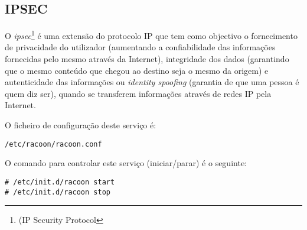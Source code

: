 \subsection{IPSEC}

O \emph{ipsec}\footnote{(IP Security Protocol} é uma extensão do protocolo IP que tem como objectivo o fornecimento de privacidade do utilizador (aumentando a confiabilidade das informações fornecidas pelo mesmo através da Internet), integridade dos dados (garantindo que o mesmo conteúdo que chegou ao destino seja o mesmo da origem) e autenticidade das informações ou \emph{identity spoofing} (garantia de que uma pessoa é quem diz ser), quando se transferem informações através de redes IP pela Internet.

O ficheiro de configuração deste serviço é:

\begin{Verbatim}[commandchars=\\\{\}]
/etc/racoon/racoon.conf
\end{Verbatim}

O comando para controlar este serviço (iniciar/parar) é o seguinte:

\begin{Verbatim}[commandchars=\\\{\}]
# /etc/init.d/racoon start
# /etc/init.d/racoon stop
\end{Verbatim}

